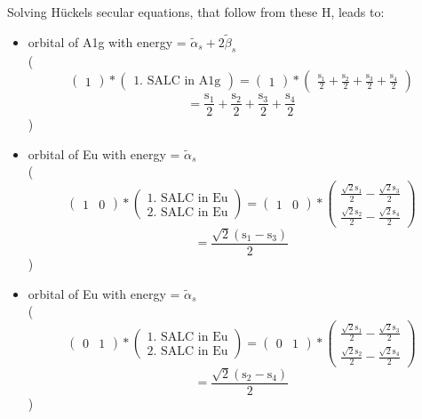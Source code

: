 \documentclass[12pt,a4paper]{article}
\begin{document}
Solving Hückels secular equations, that follow from these H, leads to:
\begin{itemize}
\item orbital of A1g with energy = 
                                $\tilde{\alpha}_{s} + 2 \tilde{\beta}_{s}$ \\
( 
$$
\begin{pmatrix}1\end{pmatrix} * \left(\begin{array}{c}\text{1. SALC in A1g}\end{array}\right) = \begin{pmatrix}1\end{pmatrix} * \begin{pmatrix}\frac{\text{s}_{1}}{2} + \frac{\text{s}_{2}}{2} + \frac{\text{s}_{3}}{2} + \frac{\text{s}_{4}}{2}\end{pmatrix} 
 $$ $$ = \frac{\text{s}_{1}}{2} + \frac{\text{s}_{2}}{2} + \frac{\text{s}_{3}}{2} + \frac{\text{s}_{4}}{2} 
 $$ 
 )

\item orbital of Eu with energy = 
                                $\tilde{\alpha}_{s}$ \\
( 
$$
\begin{pmatrix}1 & 0\end{pmatrix} * \left(\begin{array}{c}\text{1. SALC in Eu} \\ \text{2. SALC in Eu}\end{array}\right) = \begin{pmatrix}1 & 0\end{pmatrix} * \begin{pmatrix}\frac{\sqrt{2} \text{s}_{1}}{2} - \frac{\sqrt{2} \text{s}_{3}}{2}\\\frac{\sqrt{2} \text{s}_{2}}{2} - \frac{\sqrt{2} \text{s}_{4}}{2}\end{pmatrix} 
 $$ $$ = \frac{\sqrt{2} \left(\text{s}_{1} - \text{s}_{3}\right)}{2} 
 $$ 
 )

\item orbital of Eu with energy = 
                                $\tilde{\alpha}_{s}$ \\
( 
$$
\begin{pmatrix}0 & 1\end{pmatrix} * \left(\begin{array}{c}\text{1. SALC in Eu} \\ \text{2. SALC in Eu}\end{array}\right) = \begin{pmatrix}0 & 1\end{pmatrix} * \begin{pmatrix}\frac{\sqrt{2} \text{s}_{1}}{2} - \frac{\sqrt{2} \text{s}_{3}}{2}\\\frac{\sqrt{2} \text{s}_{2}}{2} - \frac{\sqrt{2} \text{s}_{4}}{2}\end{pmatrix} 
 $$ $$ = \frac{\sqrt{2} \left(\text{s}_{2} - \text{s}_{4}\right)}{2} 
 $$ 
 )


\end{itemize}
\end{document}
